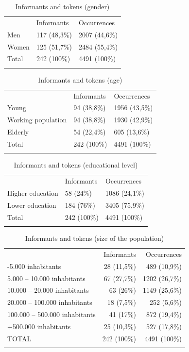 \documentclass[output=paper]{LSP/langsci}
\begin{document}
\begin{table}
\begin{tabular}{lll} & Informants & Occurrences\\
\lsptoprule
Men & 117 (48,3\%) & 2007 (44,6\%)\\
Women & 125 (51,7\%) & 2484 (55,4\%)\\
Total & 242 (100\%) & 4491 (100\%)\\
\lspbottomrule
\end{tabular}
\label{tab:4}
\caption{Informants and tokens (gender)}
\end{table}

\begin{table}
\begin{tabular}{lll} & Informants & Occurrences\\
\lsptoprule
Young & 94 (38,8\%) & 1956 (43,5\%)\\
Working population & 94 (38,8\%) & 1930 (42,9\%)\\
Elderly & 54 (22,4\%) & 605 (13,6\%)\\
Total & 242 (100\%) & 4491 (100\%)\\
\lspbottomrule
\end{tabular}
\label{tab:5}
\caption{Informants and tokens (age)}
\end{table}

\begin{table}
\begin{tabular}{lll} & Informants & Occurrences\\
\lsptoprule
Higher education & 58 (24\%) & 1086 (24,1\%)\\
Lower education & 184 (76\%) & 3405 (75,9\%)\\
Total & 242 (100\%) & 4491 (100\%)\\
\lspbottomrule
\end{tabular}
\label{tab:6}
\caption{Informants and tokens (educational level)}
\end{table}

\begin{table}
\begin{tabular}{lrr} & Informants & Occurrences\\
\lsptoprule
{}-5.000 inhabitants & 28 (11,5\%) & 489 (10,9\%)\\
5.000 – 10.000 inhabitants & 67 (27,7\%) & 1202 (26,7\%)\\
10.000 – 20.000 inhabitants & 63 (26\%) & 1149 (25,6\%)\\
20.000 – 100.000 inhabitants & 18 (7,5\%) & 252 (5,6\%)\\
100.000 – 500.000 inhabitants & 41 (17\%) & 872 (19,4\%)\\
+500.000 inhabitants & 25 (10,3\%) & 527 (17,8\%)\\
TOTAL & 242 (100\%) & 4491 (100\%)\\
\lspbottomrule
\end{tabular}
\label{tab:7}
\caption{Informants and tokens (size of the population)}
\end{table}
\end{document}
